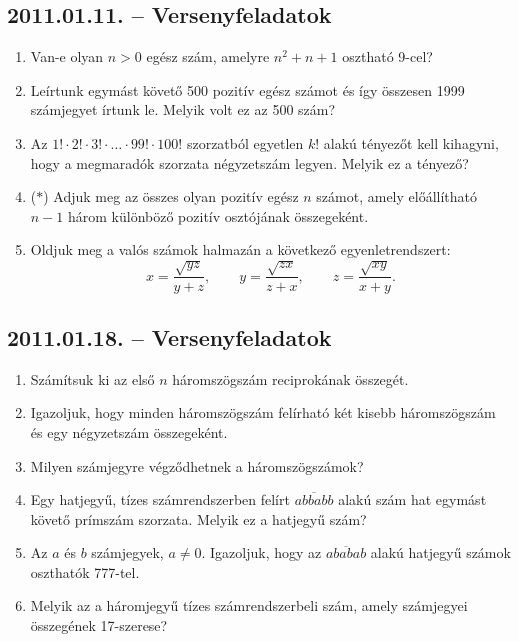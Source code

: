 \documentclass{article}
\begin{document}
\subsection*{2011.01.11. -- Versenyfeladatok}
\begin{enumerate}
\item Van-e olyan $n>0$ egész szám, amelyre $n^2+n+1$ osztható 9-cel?
\item Leírtunk egymást követő 500 pozitív egész számot és így összesen 1999 számjegyet írtunk le. Melyik volt ez az 500 szám?
\item Az $1!\cdot 2!\cdot 3!\cdot \ldots \cdot 99!\cdot 100!$ szorzatból egyetlen 
$k!$ alakú tényezőt kell kihagyni, hogy a megmaradók szorzata négyzetszám legyen.
Melyik ez a tényező?
\item ($*$) Adjuk meg az összes olyan pozitív egész $n$ számot, amely előállítható
$n-1$ három különböző pozitív osztójának összegeként.
\item Oldjuk  meg a valós számok halmazán a következő egyenletrendszert:
$$x=\dfrac{\sqrt{yz}}{y+z},\qquad
y=\dfrac{\sqrt{zx}}{z+x},\qquad
z=\dfrac{\sqrt{xy}}{x+y}.
$$
\end{enumerate}

\subsection*{2011.01.18. -- Versenyfeladatok}
\begin{enumerate}
\item Számítsuk ki az első $n$ háromszögszám reciprokának összegét.
\item Igazoljuk, hogy minden háromszögszám felírható két kisebb háromszögszám és egy négyzetszám összegeként.
\item Milyen számjegyre végződhetnek a háromszögszámok?
\item Egy hatjegyű, tízes számrendszerben felírt $\overline{abbabb}$ alakú
szám hat egymást követő prímszám szorzata. Melyik ez a hatjegyű szám?
\item Az $a$ és $b$ számjegyek, $a\ne 0$. Igazoljuk, hogy az $\overline{ababab}$
alakú hatjegyű számok oszthatók 777-tel.
\item Melyik az a háromjegyű tízes számrendszerbeli szám, amely számjegyei összegének 17-szerese?
\end{enumerate}
\end{document}
